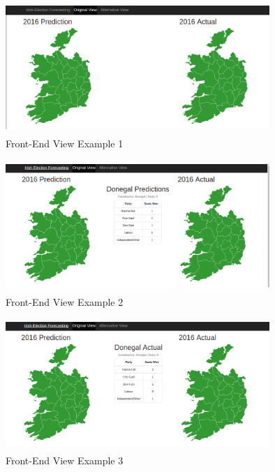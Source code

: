 \begin{figure}[h]
	\caption{Front-End View Example 1}
	\centering
	\includegraphics[width=10cm, height=5cm]{img/view1}
\end{figure}
\begin{figure}[h]
	\caption{Front-End View Example 2}
	\centering
	\includegraphics[width=10cm, height=5cm]{img/view1part2}
\end{figure}
\begin{figure}[h]
	\caption{Front-End View Example 3}
	\centering
	\includegraphics[width=10cm, height=5cm]{img/view1part3}
\end{figure}

\pagebreak

